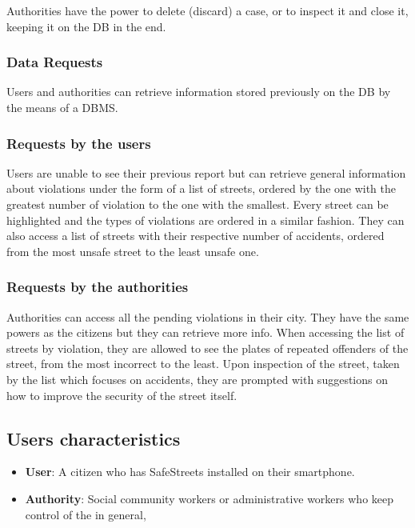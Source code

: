 Authorities have the power to delete (discard) a case, or to inspect it and close it, keeping it on the DB in the end. 

\subsubsection{Data Requests}

Users and authorities can retrieve information stored previously on the DB by the means of a DBMS.

\subsubsection*{Requests by the users}

Users are unable to see their previous report but can retrieve general information about violations under the form of a list of streets, ordered by the one with the greatest number of violation to the one with the smallest. Every street can be highlighted and the types of violations are ordered in a similar fashion. They can also access a list of streets with their respective number of accidents, ordered from the most unsafe street to the least unsafe one.

\subsubsection*{Requests by the authorities}

Authorities can access all the pending violations in their city. They have the same powers as the citizens but they can retrieve more info. When accessing the list of streets by violation, they are allowed to see the plates of repeated offenders of the street, from the most incorrect to the least. Upon inspection of the street, taken by the list which focuses on accidents, they are prompted with suggestions on how to improve the security of the street itself.


\subsection{Users characteristics}

\begin{itemize}

\item \textbf{User}: A citizen who has SafeStreets installed on their smartphone.

\item \textbf{Authority}: Social community workers or administrative workers who keep control of the in general,

\end{itemize}

